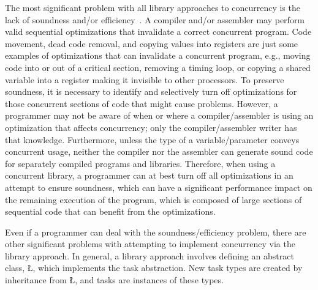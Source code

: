 \documentclass[openright,twoside]{report}
\begin{document}
The most significant problem with all library approaches to concurrency is the lack of soundness and/or efficiency~\cite{Buhr95a}.
A compiler and/or assembler may perform valid sequential optimizations that invalidate a correct concurrent program.
Code movement, dead code removal, and copying values into registers are just some examples of optimizations that can invalidate a concurrent program, e.g., moving code into or out of a critical section, removing a timing loop, or copying a shared variable into a register making it invisible to other processors.
To preserve soundness, it is necessary to identify and selectively turn off optimizations for those concurrent sections of code that might cause problems.
However, a programmer may not be aware of when or where a compiler/assembler is using an optimization that affects concurrency;
only the compiler/assembler writer has that knowledge.
Furthermore, unless the type of a variable/parameter conveys concurrent usage, neither the compiler nor the assembler can generate sound code for separately compiled programs and libraries.
Therefore, when using a concurrent library, a programmer can at best turn off all optimizations in an attempt to ensure soundness, which can have a significant performance impact on the remaining execution of the program, which is composed of large sections of sequential code that can benefit from the optimizations.

Even if a programmer can deal with the soundness/efficiency problem, there are other significant problems with attempting to implement concurrency via the library approach.
In general, a library approach involves defining an abstract class, \LGinlinetrue\LGbegin\lgrinde\L{}\endlgrinde\LGend{}, which implements the task abstraction.
New task types are created by inheritance from \LGinlinetrue\LGbegin\lgrinde\L{}\endlgrinde\LGend{}, and tasks are instances of these types.
\end{document}
